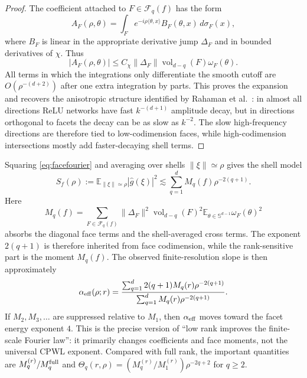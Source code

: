 \documentclass[10pt,twocolumn]{article}
\newcommand{\E}{\mathbb{E}}
\newcommand{\1}{\mathbf{1}}
\newcommand{\wh}{\widehat}
\begin{document}
\begin{proof}
The coefficient attached to $F\in\mathcal F_q(f)$ has the form
\begin{equation}
A_F(\rho,\theta)=
\int_F e^{-i\rho\langle\theta,x\rangle}
B_F(\theta,x)\,d\sigma_F(x),
\end{equation}
where $B_F$ is linear in the appropriate derivative jump $\Delta_F$ and in bounded derivatives of $\chi$.  Thus
\begin{equation}
|A_F(\rho,\theta)|
\le C_\chi\|\Delta_F\|\operatorname{vol}_{d-q}(F)\omega_F(\theta).
\end{equation}
All terms in which the integrations only differentiate the smooth cutoff are $O(\rho^{-(d+2)})$ after one extra integration by parts.  This proves the expansion and recovers the anisotropic structure identified by Rahaman et al.~\cite{rahaman2019spectral}: in almost all directions ReLU networks have fast $k^{-(d+1)}$ amplitude decay, but in directions orthogonal to facets the decay can be as slow as $k^{-2}$.  The slow high-frequency directions are therefore tied to low-codimension faces, while high-codimension intersections mostly add faster-decaying shell terms.
\end{proof}

Squaring \eqref{eq:facefourier} and averaging over shells $\|\xi\|\simeq\rho$ gives the shell model
\begin{equation}\label{eq:shelllaw}
S_f(\rho):=\E_{\|\xi\|\simeq\rho}|\wh g(\xi)|^2
\lesssim \sum_{q=1}^{d} M_q(f)\rho^{-2(q+1)}.
\end{equation}
Here
\begin{equation}
M_q(f)=\sum_{F\in\mathcal F_q(f)}
\|\Delta_F\|^2\operatorname{vol}_{d-q}(F)^2
\E_{\theta\in\mathbb S^{d-1}}\omega_F(\theta)^2
\end{equation}
absorbs the diagonal face terms and the shell-averaged cross terms.  The exponent $2(q+1)$ is therefore inherited from face codimension, while the rank-sensitive part is the moment $M_q(f)$.  The observed finite-resolution slope is then approximately
\begin{equation}\label{eq:alphaeff}
\alpha_{\rm eff}(\rho;r)=
\frac{\sum_{q=1}^{d}2(q+1)M_q(r)\rho^{-2(q+1)}}
{\sum_{q=1}^{d}M_q(r)\rho^{-2(q+1)}}.
\end{equation}
If $M_2,M_3,\ldots$ are suppressed relative to $M_1$, then $\alpha_{\rm eff}$ moves toward the facet energy exponent $4$.  This is the precise version of ``low rank improves the finite-scale Fourier law'': it primarily changes coefficients and face moments, not the universal CPWL exponent.  Compared with full rank, the important quantities are $M_q^{(r)}/M_q^{\rm full}$ and $\Theta_q(r,\rho)=(M_q^{(r)}/M_1^{(r)})\rho^{-2q+2}$ for $q\ge2$.
\end{document}
